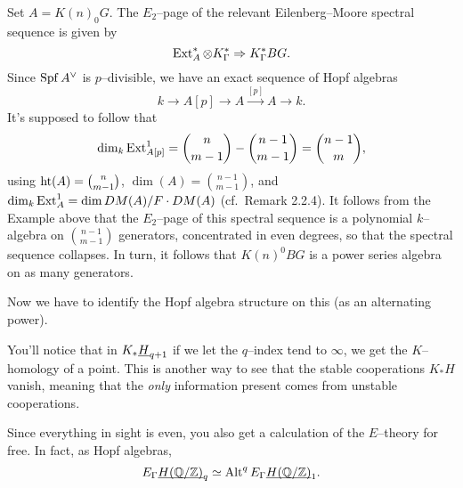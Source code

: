  Set $A = K(n)_0 G$.  The $E_2$--page of the relevant Eilenberg--Moore spectral sequence is given by \[\operatorname{Ext}_A^* \otimes K_\Gamma^* \Rightarrow K_\Gamma^* BG.\]  Since $\operatorname{Spf} A^\vee$ is $p$--divisible, we have an exact sequence of Hopf algebras \[k \to A[p] \to A \xrightarrow{[p]} A \to k.\]  It's supposed to follow that \[\dim_k \operatorname{Ext}^1_{A[p]} = \binom{n}{m-1} - \binom{n-1}{m-1} = \binom{n-1}{m},\] using $\operatorname{ht}(A) = \binom{n}{m-1}$, $\dim(A) = \binom{n-1}{m-1}$, and $\dim_k \operatorname{Ext}^1_A = \dim DM(A) / F \cdot DM(A)$ (cf.\ Remark 2.2.4).  It follows from the Example above that the $E_2$--page of this spectral sequence is a polynomial $k$--algebra on $\binom{n-1}{m-1}$ generators, concentrated in even degrees, so that the spectral sequence collapses.  In turn, it follows that $K(n)^0 BG$ is a power series algebra on as many generators.

 Now we have to identify the Hopf algebra structure on this (as an alternating power).


\begin{remark}
\end{remark}









\begin{remark}
You'll notice that in $K_* \underline{\smash{H}}_{q+1}$ if we let the $q$--index tend to $\infty$, we get the $K$--homology of a point.  This is another way to see that the stable cooperations $K_* H$ vanish, meaning that the \emph{only} information present comes from unstable cooperations.
\end{remark}

\begin{remark}
Since everything in sight is even, you also get a calculation of the $E$--theory for free.  In fact, as Hopf algebras, \[E_\Gamma \underline{\smash{H(\mathbb{Q}/\mathbb Z)}}_{q} \simeq \operatorname{Alt}^q E_\Gamma \underline{\smash{H(\mathbb{Q}/\mathbb Z)}}_{1}.\]
\end{remark}

